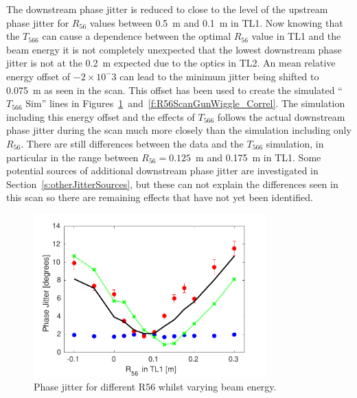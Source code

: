 The downstream phase jitter is reduced to close to the level of the upstream phase jitter for \(R_{56}\) values between 0.5~m and 0.1~m in TL1.  Now knowing that the \(T_{566}\) can cause a dependence between the optimal \(R_{56}\) value in TL1 and the beam energy it is not completely unexpected that the lowest downstream phase jitter is not at the 0.2~m expected due to the optics in TL2. An mean relative energy offset of \(-2\times10^-3\) can lead to the minimum jitter being shifted to 0.075~m as seen in the scan. This offset has been used to create the simulated ``\(T_{566}\) Sim'' lines  in Figures~\ref{f:R56ScanGunWiggle_PhaseJitter}~and~\ref{f:R56ScanGunWiggle_Correl}. The simulation including this energy offset and the effects of \(T_{566}\) follows the actual downstream phase jitter during the scan much more closely than the simulation including only \(R_{56}\). There are still differences between the data and the \(T_{566}\) simulation, in particular in the range between \(R_{56} = 0.125\)~m and 0.175~m in TL1. Some potential sources of additional downstream phase jitter are investigated in Section~\ref{s:otherJitterSources}, but these can not explain the differences seen in this scan so there are remaining effects that have not yet been identified.

\begin{figure}
  \centering
  \includegraphics[width=0.8\textwidth]{Figures/propagation/R56ScanGunWiggle_PhaseJitter}
  \caption{Phase jitter for different R56 whilst varying beam energy.}
  \label{f:R56ScanGunWiggle_PhaseJitter}
\end{figure}

